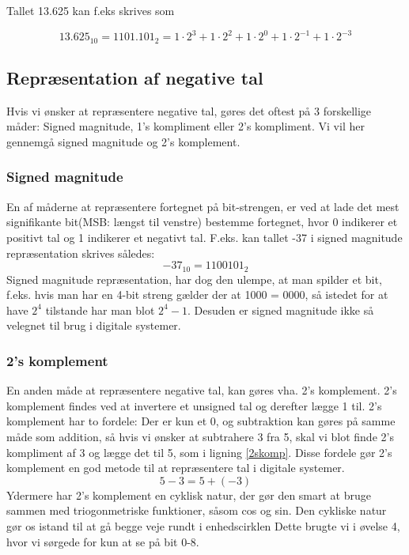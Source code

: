 Tallet 13.625 kan f.eks skrives som

\begin{equation}
13.625_{10} = 1101.101_2 = 1 \cdot 2^3+1 \cdot 2^2+1 \cdot 2^0+1 \cdot 2^{-1}+1 \cdot 2^{-3}
\end{equation}

\subsection{Repræsentation af negative tal}
Hvis vi ønsker at repræsentere negative tal, gøres det oftest på 3 forskellige måder: 
Signed magnitude, 1's kompliment eller 2's kompliment. Vi vil her gennemgå signed magnitude og 2's komplement.
\subsubsection{Signed magnitude}
En af måderne at repræsentere fortegnet på bit-strengen, er ved at lade det mest signifikante bit(MSB: længst til venstre) bestemme fortegnet, hvor 0 indikerer et positivt tal og 1 indikerer et negativt tal.  F.eks. kan tallet -37 i signed magnitude repræsentation skrives således:
\begin{equation}
-37_{10} = 1100101_2 
\end{equation}
Signed magnitude repræsentation, har dog den ulempe, at man spilder et bit, f.eks. hvis man har en 4-bit streng gælder der at 1000 =  0000, så istedet for at have $2^4$ tilstande har man blot $2^4-1$. Desuden er signed magnitude ikke så velegnet til brug i digitale systemer.\cite[s.~260]{Dlogic}
\subsubsection{2's komplement}
En anden måde at repræsentere negative tal, kan gøres vha. 2's komplement. 2's komplement findes ved at invertere et unsigned tal og derefter lægge 1 til. 2's komplement har to fordele: Der er kun et 0, og subtraktion kan gøres på samme måde som addition, så hvis vi ønsker at subtrahere 3 fra 5, skal vi blot finde 2's kompliment af 3 og lægge det til 5, som i ligning \ref{2skomp}.  Disse fordele gør 2's komplement en god metode til at repræsentere tal i digitale systemer.
\begin{equation}
\label{2skomp}
 5-3 = 5+(-3)
\end{equation}
Ydermere har 2's komplement en cyklisk natur, der gør den smart at bruge sammen med triogonmetriske funktioner, såsom cos og sin. Den cykliske natur gør os istand til at gå begge veje rundt i enhedscirklen Dette brugte vi i øvelse 4, hvor vi sørgede for kun at se på bit 0-8.

